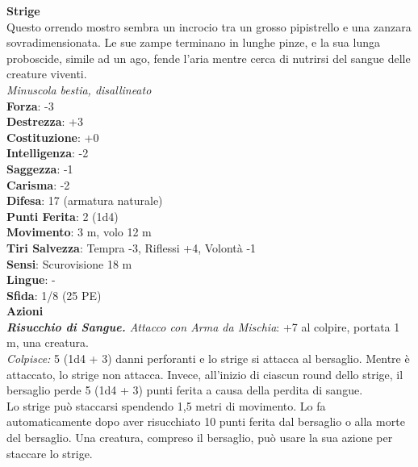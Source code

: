 \begin{multicols}{2}
\medskip\textbf{Strige}\\
Questo orrendo mostro sembra un incrocio tra un grosso pipistrello e una zanzara sovradimensionata. Le sue zampe terminano in lunghe pinze, e la sua lunga proboscide, simile ad un ago, fende l'aria mentre cerca di nutrirsi del sangue delle creature viventi.\\
\emph{Minuscola bestia, disallineato}\\
\textbf{Forza}: -3\\
\textbf{Destrezza}: +3\\
\textbf{Costituzione}: +0\\
\textbf{Intelligenza}: -2\\
\textbf{Saggezza}: -1\\
\textbf{Carisma}: -2\\
\textbf{Difesa}: 17 (armatura naturale)\\
\textbf{Punti Ferita}: 2 (1d4)\\
\textbf{Movimento}: 3 m, volo 12 m\\
\textbf{Tiri Salvezza}: Tempra -3, Riflessi +4, Volontà -1\\
\textbf{Sensi}: Scurovisione 18 m\\
\textbf{Lingue}: -\\
\textbf{Sfida}: 1/8 (25 PE)\smallskip\\
\smallskip\textbf{Azioni}\\
\emph{\textbf{Risucchio di Sangue.} Attacco con Arma da Mischia}: +7 al colpire, portata 1 m, una creatura.\\
\emph{Colpisce:} 5 (1d4 + 3) danni perforanti e lo strige si attacca al bersaglio. Mentre è attaccato, lo strige non attacca. Invece, all'inizio di ciascun round dello strige, il bersaglio perde 5 (1d4 + 3) punti ferita a causa della perdita di sangue.\\
Lo strige può staccarsi spendendo 1,5 metri di movimento. Lo fa automaticamente dopo aver risucchiato 10 punti ferita dal bersaglio o alla morte del bersaglio. Una creatura, compreso il bersaglio, può usare la sua azione per staccare lo strige.\\


\end{multicols}
